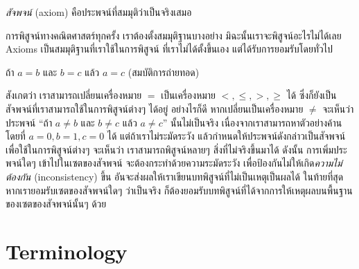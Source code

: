 \begin{definition}
\emph{สัจพจน์} (axiom) คือประพจน์ที่สมมุติว่าเป็นจริงเสมอ
\end{definition}
การพิสูจน์ทางคณิตศาสตร์ทุกครั้ง เราต้องตั้งสมมุติฐานบางอย่าง มิฉะนั้นเราจะพิสูจน์อะไรไม่ได้เลย \enskip Axioms เป็นสมมุติฐานที่เราใช้ในการพิสูจน์ ที่เราไม่ได้ตั้งขึ้นเอง แต่ได้รับการยอมรับโดยทั่วไป

\begin{example}
ถ้า $a=b$ และ $b=c$ แล้ว $a=c$ (สมบัติการถ่ายทอด)
\end{example}
สังเกตว่า เราสามารถเปลี่ยนเครื่องหมาย $=$ เป็นเครื่องหมาย $<,\leq,>,\geq$ ได้ ซึ่งก็ยังเป็นสัจพจน์ที่เราสามารถใช้ในการพิสูจน์ต่างๆ ได้อยู่ \enskip อย่างไรก็ดี หากเปลี่ยนเป็นเครื่องหมาย $\neq$ จะเห็นว่าประพจน์  ``ถ้า $a\neq b$ และ $b\neq c$ แล้ว $a\neq c$'' นั้นไม่เป็นจริง เนื่องจากเราสามารถหาตัวอย่างค้านโดยที่ $a=0, b=1, c=0$ ได้ \enskip แต่ถ้าเราไม่ระมัดระวัง แล้วกำหนดให้ประพจน์ดังกล่าวเป็นสัจพจน์เพื่อใช้ในการพิสูจน์ต่างๆ จะเห็นว่า เราสามารถพิสูจน์หลายๆ สิ่งที่ไม่จริงขึ้นมาได้ \enskip ดังนั้น การเพิ่มประพจน์ใดๆ เข้าไปในเซตของสัจพจน์ จะต้องกระทำด้วยความระมัดระวัง เพื่อป้องกันไม่ให้เกิด\emph{ความไม่ต้องกัน} (inconsistency) ขึ้น อันจะส่งผลให้เราเขียนบทพิสูจน์ที่ไม่เป็นเหตุเป็นผลได้ \enskip ในท้ายที่สุด หากเรายอมรับเซตของสัจพจน์ใดๆ ว่าเป็นจริง ก็ต้องยอมรับบทพิสูจน์ที่ได้จากการให้เหตุผลบนพื้นฐานของเซตของสัจพจน์นั้นๆ ด้วย


\section{Terminology}

